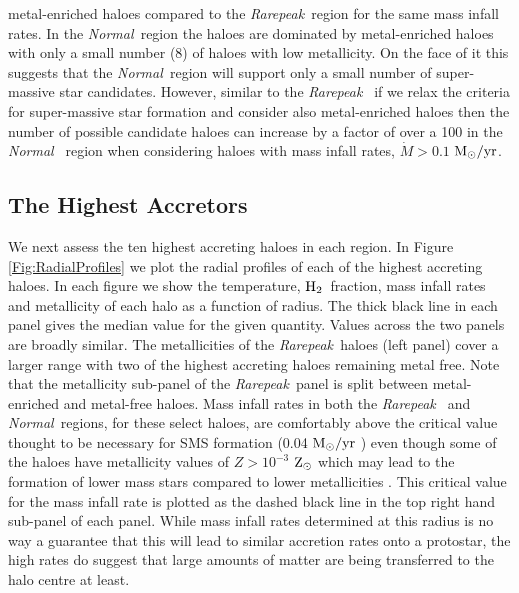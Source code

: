 \documentclass[graphics, twocolumn, usenatbib]{mn2e}
\newcommand{\msolaryr} {$\rm{M_{\odot}/yr}~$}
\newcommand{\msolaryrc} {$\rm{M_{\odot}/yr}$}
\newcommand{\zsolar} {$\rm{Z_{\odot}}~$}
\newcommand{\molH} {$\rm{H_2}$~}
\newcommand{\rarepeak} {\textit{Rarepeak~}}
\newcommand{\normal} {\textit{Normal~}}
\begin{document}
metal-enriched haloes compared to the \rarepeak region for the same mass infall rates. In the
\normal region the haloes are dominated by metal-enriched haloes with only a small number (8)
of haloes with low metallicity. On the face of it this suggests that the \normal region will
support only a small number of super-massive star candidates. However, similar to the \rarepeak
if we relax the criteria for super-massive star formation and consider also metal-enriched haloes
then the number of possible candidate haloes can increase by a factor of over a 100 in the \normal
region when considering haloes with mass infall rates, $\dot{M} > 0.1 $ \msolaryrc. 



\subsection{The Highest Accretors}
\indent We next assess the ten highest accreting haloes in each region. In Figure
\ref{Fig:RadialProfiles} we plot the radial profiles of each of the highest accreting haloes.
In each figure we show the temperature, \molH fraction, mass infall rates and
metallicity of each halo as a function of radius. The thick black line in each panel gives the
median value for the given quantity. Values across the two panels are broadly similar. The
metallicities of the \rarepeak haloes (left panel) cover a larger range with two of the highest
accreting haloes remaining metal free. Note that the metallicity sub-panel of the \rarepeak panel
is split between metal-enriched and metal-free haloes. Mass infall rates in both the \rarepeak
and \normal regions, for these select haloes, are comfortably above the critical value thought to
be necessary for SMS formation (0.04
\msolaryr \citep{Sakurai_2016}) even though some of the haloes have metallicity values of $Z > 10^{-3}$
\zsolar which may lead to the formation of lower mass stars compared to lower metallicities
\citep{Chon_2020}. This critical value for the mass infall rate is plotted as the dashed black line in
the top right hand sub-panel of each panel. While mass infall rates determined at this radius is no
way a guarantee that this will lead to similar accretion rates onto a protostar, the high rates do
suggest that large amounts of matter are being transferred to the halo centre at least. \\
\end{document}
